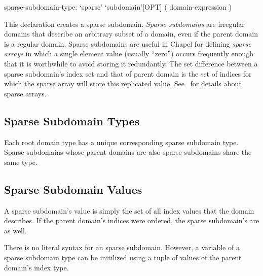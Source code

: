 \begin{syntax}
sparse-subdomain-type:
  `sparse' `subdomain'[OPT] ( domain-expression )
\end{syntax}

This declaration creates a sparse subdomain.
 \emph{Sparse subdomains} are irregular domains that describe an
arbitrary subset of a domain, even if the parent domain is a regular
domain.  Sparse subdomains are useful in Chapel for
defining \emph{sparse arrays} in which a single element value (usually ``zero'')
 occurs
frequently enough that it is worthwhile to avoid storing it
redundantly.  The set difference between a sparse subdomain's index set
and that of parent domain is the set of indices for which the
sparse array will store this replicated value.
See~ for details about sparse arrays.

\subsection{Sparse Subdomain Types}

Each root domain type has a unique corresponding sparse subdomain
type.  Sparse subdomains whose parent domains are also sparse
subdomains share the same type.

\subsection{Sparse Subdomain Values}
\label{Sparse_Domain_Values}

A sparse subdomain's value is simply the set of all index values that
the domain describes.  If the parent domain's indices were ordered,
the sparse subdomain's are as well.

There is no literal syntax for an sparse subdomain.  However, a variable of a
sparse subdomain type can be initilized using a tuple of values
of the parent domain's index type.

